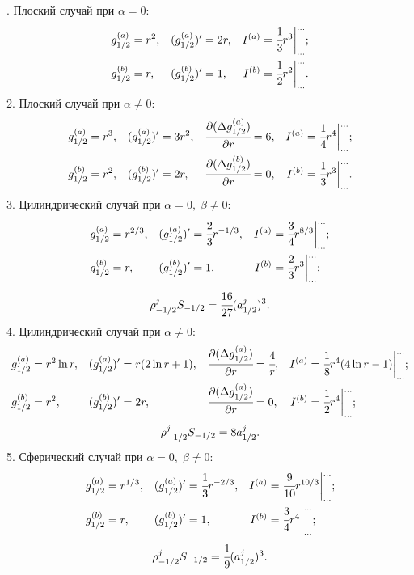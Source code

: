 . Плоский случай при $\alpha = 0$:
\multeqstart
\begin{align*}
	g_{1/2}^{(a)} &= r^2, & (g_{1/2}^{(a)})' &= 2r, & I^{(a)} &= \cfrac{1}{3} r^3 {\bigg|_{...}^{...}} {\text{;}} \\
	g_{1/2}^{(b)} &= r, & (g_{1/2}^{(b)})' &= 1, & I^{(b)} &= \cfrac{1}{2} r^2 {\bigg|_{...}^{...}} {\text{.}}
\end{align*}
2. Плоский случай при $\alpha \neq 0$:
\begin{align*}
	g_{1/2}^{(a)} &= r^3, & (g_{1/2}^{(a)})' &= 3r^2, & \cfrac{\partial (\Delta g_{1/2}^{(a)})}{\partial r} &= 6, & I^{(a)} &= \cfrac{1}{4} r^4 {\bigg|_{...}^{...}} {\text{;}} \\
	g_{1/2}^{(b)} &= r^2, & (g_{1/2}^{(b)})' &= 2r, & \cfrac{\partial (\Delta g_{1/2}^{(b)})}{\partial r} &= 0, & I^{(b)} &= \cfrac{1}{3} r^3 {\bigg|_{...}^{...}} {\text{.}}
\end{align*}
3. Цилиндрический случай при $\alpha = 0, \; \beta \neq 0$:
\begin{align*}
g_{1/2}^{(a)} &= r^{2/3}, & (g_{1/2}^{(a)})' &= \cfrac{2}{3} r^{-1/3}, & I^{(a)} &= \cfrac{3}{4} r^{8/3} {\bigg|_{...}^{...}} {\text{;}} \\
g_{1/2}^{(b)} &= r, & (g_{1/2}^{(b)})' &= 1, & I^{(b)} &= \cfrac{2}{3} r^3 {\bigg|_{...}^{...}} {\text{;}}
\end{align*}
\multeqnext
$$\rho_{-1/2}^j S_{-1/2} = \cfrac{16}{27} (a_{1/2}^j)^3 {\text{.}}$$
4. Цилиндрический случай при $\alpha \neq 0$:
\begin{align*}
	g_{1/2}^{(a)} &= r^2 \ln r, & (g_{1/2}^{(a)})' &= r (2 \ln r + 1), & \cfrac{\partial (\Delta g_{1/2}^{(a)})}{\partial r} &= \cfrac{4}{r}, & I^{(a)} &= \cfrac{1}{8} r^4 (4 \ln r - 1) {\bigg|_{...}^{...}} {\text{;}} \\
	g_{1/2}^{(b)} &= r^2, & (g_{1/2}^{(b)})' &= 2r, & \cfrac{\partial (\Delta g_{1/2}^{(a)})}{\partial r} &= 0, & I^{(b)} &= \cfrac{1}{2} r^4 {\bigg|_{...}^{...}} {\text{;}}
\end{align*}
\multeqnext
$$\rho_{-1/2}^j S_{-1/2} = 8 a_{1/2}^j {\text{.}}$$
5. Сферический случай при $\alpha = 0, \; \beta \neq 0$:
\begin{align*}
	g_{1/2}^{(a)} &= r^{1/3}, & (g_{1/2}^{(a)})' &= \cfrac{1}{3} r^{-2/3}, & I^{(a)} &= \cfrac{9}{10} r^{10/3} {\bigg|_{...}^{...}}  {\text{;}} \\
	g_{1/2}^{(b)} &= r, & (g_{1/2}^{(b)})' &= 1, & I^{(b)} &= \cfrac{3}{4} r^4 {\bigg|_{...}^{...}} {\text{;}}
\end{align*}
\multeqnext
$$\rho_{-1/2}^j S_{-1/2} = \cfrac{1}{9} (a_{1/2}^j)^3 {\text{.}}$$
\multeqfinish
